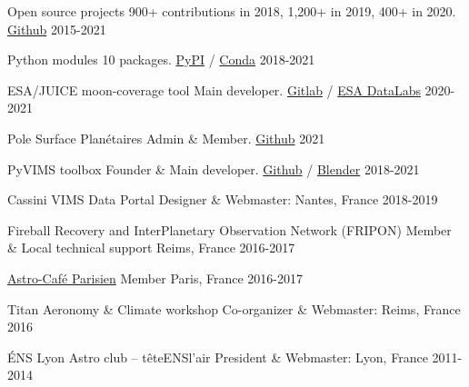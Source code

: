 
\begin{cventries}

  \cventry
    {Open source projects}
    {900+ contributions in 2018, 1,200+ in 2019, 400+ in 2020.}
    {\href{https://github.com/seignovert/}{Github}}
    {2015-2021}
    {}

  \cventry
    {Python modules}
    {10 packages.}
    {\href{https://pypi.org/user/seignovert/}{PyPI} /
     \href{https://anaconda.org/seignovert}{Conda}}
    {2018-2021}
    {}

  \cventry
    {ESA/JUICE moon-coverage tool}
    {Main developer.}
    {\href{https://juigitlab.esac.esa.int/datalab/moon-coverage}{Gitlab} /
     \href{https://datalabs.esa.int}{ESA DataLabs}}
    {2020-2021}
    {}

    \cventry
    {Pole Surface Planétaires}
    {Admin \& Member.}
    {\href{https://github.com/pole-surfaces-planetaires}{Github}}
    {2021}
    {}

    \cventry
    {PyVIMS toolbox}
    {Founder \& Main developer.}
    {\href{https://github.com/seignovert/pyvims/tree/dev}{Github} /
     \href{https://mybinder.org/v2/gh/seignovert/pyvims/dev?filepath=notebooks/pyvims.ipynb}{Blender}}
    {2018-2021}
    {}

  \cventry
    {Cassini VIMS Data Portal}
    {Designer \& Webmaster: }
    {Nantes, France}
    {2018-2019}
    {}

    \cventry
    {Fireball Recovery and InterPlanetary Observation Network (FRIPON)}
    {Member \& Local technical support}
    {Reims, France}
    {2016-2017}
    {}

  \cventry
    {\href{https://cafeastroparisien.wordpress.com/}{Astro-Café Parisien}}
    {Member}
    {Paris, France}
    {2016-2017}
    {}

  \cventry
    {Titan Aeronomy \& Climate workshop}
    {Co-organizer \& Webmaster: }
    {Reims, France}
    {2016}
    {}

  \cventry
    {ÉNS Lyon Astro club -- têteENSl'air}
    {President \& Webmaster: }
    {Lyon, France}
    {2011-2014}
    {}

\end{cventries}
